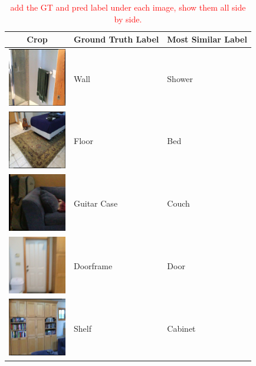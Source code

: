 \begin{table}[h]
    \centering
    \caption{\textcolor{red}{add the GT and pred label under each image, show them all side by side.}}
    \begin{tabular}{|c|l|l|}
        \hline
        \textbf{Crop} & \textbf{Ground Truth Label} & \textbf{Most Similar Label} \\ \hline
        \includegraphics[width=1in]{images/wall.png} & Wall & Shower \\ \hline
        \includegraphics[width=1in]{images/floor.png} & Floor & Bed \\ \hline
        \includegraphics[width=1in]{images/guitar case.png} & Guitar Case & Couch \\ \hline
        \includegraphics[width=1in]{images/doorframe.png} & Doorframe & Door \\ \hline
        \includegraphics[width=1in]{images/shelf.png} & Shelf & Cabinet \\ \hline
    \end{tabular}
\end{table}

